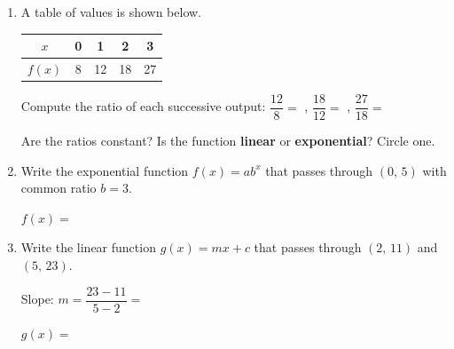 \documentclass[10pt]{article}
\begin{document}
\namedateperiod

\vspace{0.14in}

\begin{enumerate}[itemsep=16pt]

\item A table of values is shown below.

      \renewcommand{\arraystretch}{1.4}
      \begin{tabular}{|c|c|c|c|c|}
        \hline
        $x$    & 0 & 1  & 2  & 3  \\
        \hline
        $f(x)$ & 8 & 12 & 18 & 27 \\
        \hline
      \end{tabular}

      \vspace{0.08in}
      Compute the ratio of each successive output: $\dfrac{12}{8} = $ \blank{1.5cm},
      $\dfrac{18}{12} = $ \blank{1.5cm},
      $\dfrac{27}{18} = $ \blank{1.5cm}

      \vspace{0.06in}
      Are the ratios constant? \blank{2cm} \quad
      Is the function \textbf{linear} or \textbf{exponential}? Circle one.

\item Write the exponential function $f(x) = ab^x$ that passes through $(0,\,5)$ with
      common ratio $b = 3$.

      \vspace{0.06in}
      $f(x) = $ \blank{6cm}

\item Write the linear function $g(x) = mx + c$ that passes through $(2,\,11)$ and $(5,\,23)$.

      \vspace{0.06in}
      Slope: $m = \dfrac{23 - 11}{5 - 2} = $ \blank{2cm}

      \vspace{0.06in}
      $g(x) = $ \blank{6cm}

\end{enumerate}
\end{document}
